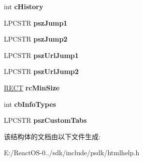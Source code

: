 \begin{DoxyCompactItemize}
int {\bfseries c\+History}
\item 
\mbox{\label{structtag_h_h___w_i_n_t_y_p_e_a_a3ce1e324b397af8be519426a079d3928}} 
L\+P\+C\+S\+TR {\bfseries psz\+Jump1}
\item 
\mbox{\label{structtag_h_h___w_i_n_t_y_p_e_a_a66963970cad32c6806470cc5e75e881a}} 
L\+P\+C\+S\+TR {\bfseries psz\+Jump2}
\item 
\mbox{\label{structtag_h_h___w_i_n_t_y_p_e_a_aff4cf44a9f3add71bb9494fa4d14e026}} 
L\+P\+C\+S\+TR {\bfseries psz\+Url\+Jump1}
\item 
\mbox{\label{structtag_h_h___w_i_n_t_y_p_e_a_acc28c39e4a42d9c0120d58733ba36543}} 
L\+P\+C\+S\+TR {\bfseries psz\+Url\+Jump2}
\item 
\mbox{\label{structtag_h_h___w_i_n_t_y_p_e_a_ad97c31b67d00061ed28204631b4591dc}} 
\hyperlink{structtag_r_e_c_t}{R\+E\+CT} {\bfseries rc\+Min\+Size}
\item 
\mbox{\label{structtag_h_h___w_i_n_t_y_p_e_a_abe4d4d6058ae6f84f5e66b69e24e6b20}} 
int {\bfseries cb\+Info\+Types}
\item 
\mbox{\label{structtag_h_h___w_i_n_t_y_p_e_a_abd8a68f26f9139622b5131c499331dba}} 
L\+P\+C\+S\+TR {\bfseries psz\+Custom\+Tabs}
\end{DoxyCompactItemize}


该结构体的文档由以下文件生成\+:\begin{DoxyCompactItemize}
\item 
E\+:/\+React\+O\+S-\/0../sdk/include/psdk/htmlhelp.\+h\end{DoxyCompactItemize}
